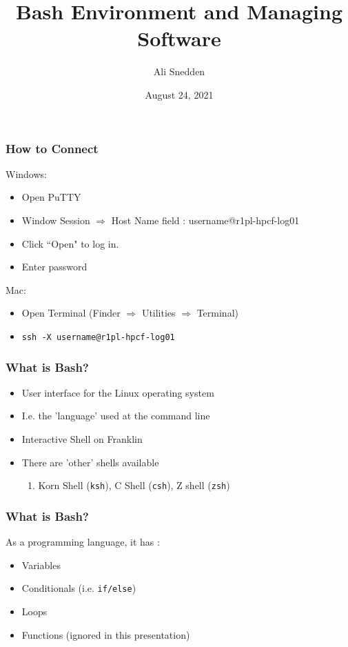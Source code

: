 \documentclass{beamer}
\title{Bash Environment and Managing Software}
\author{Ali Snedden}
\institute{Nationwide Children's Hospital}
\date{August 24, 2021}
\newcommand{\code}[1]{\colorbox{codegray}{\texttt{#1}}}
\begin{document}
 
\frame{\titlepage}




\begin{frame}
\frametitle{How to Connect}
Windows:
\begin{itemize}
    \item Open PuTTY
    \item Window Session $\Rightarrow$ Host Name field : username@r1pl-hpcf-log01
    \item Click ``Open" to log in.
    \item Enter password
\end{itemize}

Mac:
\begin{itemize}
    \item Open Terminal (Finder $\Rightarrow$ Utilities $\Rightarrow$ Terminal)
    \item \code{ssh -X username@r1pl-hpcf-log01}
\end{itemize}
\end{frame}



\begin{frame}
\frametitle{What is Bash?}
\begin{itemize}
    \item User interface for the Linux operating system
    \pause
    \item I.e. the 'language' used at the command line
    \pause
    \item Interactive Shell on Franklin
    \pause
    \item There are 'other' shells available
    \begin{enumerate}
        \item Korn Shell (\code{ksh}), C Shell (\code{csh}), Z shell (\code{zsh})
    \end{enumerate}
\end{itemize}
\end{frame}


\begin{frame}
\frametitle{What is Bash?}
As a programming language, it has :
\begin{itemize}
    \item Variables 
    \pause
    \item Conditionals (i.e. \code{if/else})
    \pause
    \item Loops 
    \pause
    \item Functions (ignored in this presentation)
\end{itemize}
\end{frame}
\end{document}
